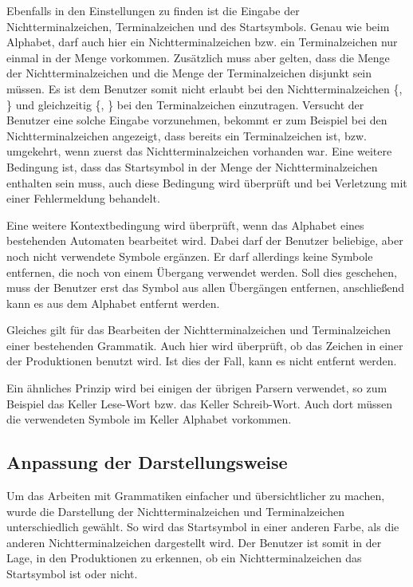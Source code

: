 Ebenfalls in den Einstellungen zu finden ist die Eingabe der
Nichtterminalzeichen, Terminalzeichen und des Startsymbols. Genau wie beim
Alphabet, darf auch hier ein Nichtterminalzeichen bzw. ein Terminalzeichen nur
einmal in der Menge vorkommen. Zusätzlich muss aber gelten, dass die Menge der
Nichtterminalzeichen  und die Menge der Terminalzeichen disjunkt sein müssen. Es
ist dem Benutzer somit nicht erlaubt bei den Nichtterminalzeichen
\{, \} und gleichzeitig
\{, \} bei den Terminalzeichen einzutragen.
Versucht der Benutzer eine solche Eingabe vorzunehmen, bekommt er zum Beispiel
bei den Nichtterminalzeichen angezeigt, dass  bereits ein
Terminalzeichen ist, bzw. umgekehrt, wenn zuerst das Nichtterminalzeichen
vorhanden war. Eine weitere Bedingung ist, dass das Startsymbol in der Menge der
Nichtterminalzeichen enthalten sein muss, auch diese Bedingung wird überprüft
und bei Verletzung mit einer Fehlermeldung behandelt.\vspace{10pt}

Eine weitere Kontextbedingung wird überprüft, wenn das Alphabet eines
bestehenden Automaten bearbeitet wird. Dabei darf der Benutzer beliebige, aber
noch nicht verwendete Symbole ergänzen. Er darf allerdings keine Symbole
entfernen, die noch von einem Übergang verwendet werden. Soll dies geschehen,
muss der Benutzer erst das Symbol aus allen Übergängen entfernen,
anschließend kann es aus dem Alphabet entfernt werden.\vspace{10pt}

Gleiches gilt für das Bearbeiten der Nichtterminalzeichen und Terminalzeichen
einer bestehenden Grammatik. Auch hier wird überprüft, ob das Zeichen in einer
der Produktionen benutzt wird. Ist dies der Fall, kann es nicht entfernt
werden.\vspace{10pt}

Ein ähnliches Prinzip wird bei einigen der übrigen Parsern verwendet, so zum
Beispiel das Keller Lese-Wort bzw. das Keller Schreib-Wort. Auch dort müssen
die verwendeten Symbole im Keller Alphabet vorkommen.\vspace{10pt}


\subsection{Anpassung der Darstellungsweise}\label{ParserAdaption}

Um das Arbeiten mit Grammatiken einfacher und übersichtlicher zu
machen, wurde die Darstellung der Nichtterminalzeichen und
Terminalzeichen unterschiedlich gewählt. So wird das Startsymbol in einer
anderen Farbe, als die anderen Nichtterminalzeichen dargestellt wird. Der
Benutzer ist somit in der Lage, in den Produktionen zu erkennen, ob ein
Nichtterminalzeichen das Startsymbol ist oder nicht.\vspace{10pt}

